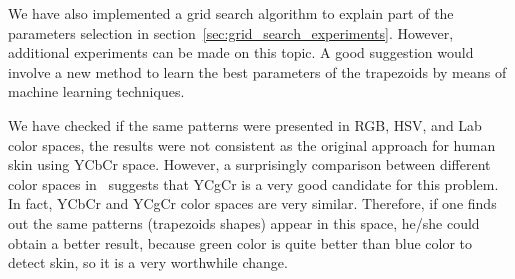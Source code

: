 We have also implemented a grid search algorithm to explain part of the parameters selection in section~\ref{sec:grid_search_experiments}. However, additional experiments can be made on this topic. A good suggestion would involve a new method to learn the best parameters of the trapezoids by means of machine learning techniques.

We have checked if the same patterns were presented in RGB, HSV, and Lab color spaces, the results were not consistent as the original approach for human skin using YCbCr space. However, a surprisingly comparison between different color spaces in~\citet{chaves:10} suggests that YCgCr is a very good candidate for this problem. In fact, YCbCr and YCgCr color spaces are very similar. Therefore, if one finds out the same patterns (trapezoids shapes) appear in this space, he/she could obtain a better result, because green color is quite better than blue color to detect skin, so it is a very worthwhile change.